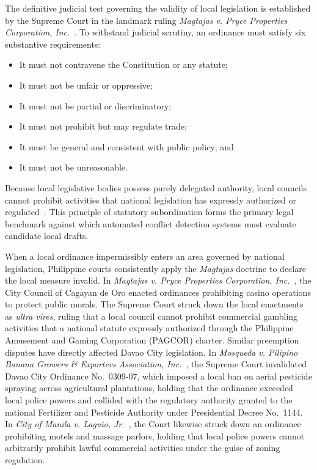     The definitive judicial test governing the validity of local legislation is established by the Supreme Court in the landmark ruling \textit{Magtajas v. Pryce Properties Corporation, Inc.}~\cite{scp1994magtajasvpryce}. To withstand judicial scrutiny, an ordinance must satisfy six substantive requirements:
    \begin{itemize}
        \item It must not contravene the Constitution or any statute;
        \item It must not be unfair or oppressive;
        \item It must not be partial or discriminatory;
        \item It must not prohibit but may regulate trade;
        \item It must be general and consistent with public policy; and
        \item It must not be unreasonable.
    \end{itemize}
    Because local legislative bodies possess purely delegated authority, local councils cannot prohibit activities that national legislation has expressly authorized or regulated~\cite{philgov1991ra7160}. This principle of statutory subordination forms the primary legal benchmark against which automated conflict detection systems must evaluate candidate local drafts.

    When a local ordinance impermissibly enters an area governed by national legislation, Philippine courts consistently apply the \textit{Magtajas} doctrine to declare the local measure invalid. In \textit{Magtajas v. Pryce Properties Corporation, Inc.}~\cite{scp1994magtajasvpryce}, the City Council of Cagayan de Oro enacted ordinances prohibiting casino operations to protect public morals. The Supreme Court struck down the local enactments as \textit{ultra vires}, ruling that a local council cannot prohibit commercial gambling activities that a national statute expressly authorized through the Philippine Amusement and Gaming Corporation (PAGCOR) charter. Similar preemption disputes have directly affected Davao City legislation. In \textit{Mosqueda v. Pilipino Banana Growers \& Exporters Association, Inc.}~\cite{scp2016mosqueda}, the Supreme Court invalidated Davao City Ordinance No.~0309-07, which imposed a local ban on aerial pesticide spraying across agricultural plantations, holding that the ordinance exceeded local police powers and collided with the regulatory authority granted to the national Fertilizer and Pesticide Authority under Presidential Decree No.~1144. In \textit{City of Manila v. Laguio, Jr.}~\cite{scp2005manilavlaguio}, the Court likewise struck down an ordinance prohibiting motels and massage parlors, holding that local police powers cannot arbitrarily prohibit lawful commercial activities under the guise of zoning regulation.

